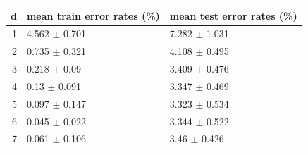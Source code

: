 \begin{tabular}{rll}
\toprule
d & mean train error rates (\%) & mean test error rates (\%) \\
\midrule
1 & 4.562 $\pm$ 0.701 & 7.282 $\pm$ 1.031 \\
2 & 0.735 $\pm$ 0.321 & 4.108 $\pm$ 0.495 \\
3 & 0.218 $\pm$ 0.09 & 3.409 $\pm$ 0.476 \\
4 & 0.13 $\pm$ 0.091 & 3.347 $\pm$ 0.469 \\
5 & 0.097 $\pm$ 0.147 & 3.323 $\pm$ 0.534 \\
6 & 0.045 $\pm$ 0.022 & 3.344 $\pm$ 0.522 \\
7 & 0.061 $\pm$ 0.106 & 3.46 $\pm$ 0.426 \\
\bottomrule
\end{tabular}
